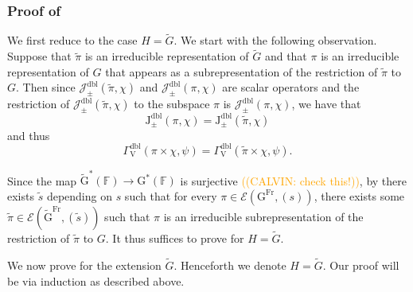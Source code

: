 \documentclass[12pt, reqno]{amsart}
\theoremstyle{definition}
\theoremstyle{definition}
\theoremstyle{definition}
\newcommand{\hermitianSpace}{\mathrm{V}}
\newcommand{\fieldCharacter}{\psi}
\newcommand{\GroupExtension}[1]{\widetilde{#1}}
\newcommand{\finiteField}{\mathbb{F}}
\newcommand{\Frobenius}{\operatorname{Fr}}
\newcommand{\dblJacobiSum}[2]{\mathcal{J}_{\pm}^{\mathrm{dbl}}\left(#1, #2\right)}
\newcommand{\dblJacobiSumScalar}[2]{\mathrm{J}_{\pm}^{\mathrm{dbl}}\left(#1, #2\right)}
\newcommand{\dblGammaFactorSpace}[4]{\Gamma^{\mathrm{dbl}}_{#1}\left(#2 \times #3, #4\right)}
\newcommand{\algebraicGroup}[1]{\boldsymbol{\mathrm{#1}}}
\newcommand{\LusztigSeries}[2]{\mathcal{E}\left(#1, (#2)\right)}
\newcommand{\FrobeniusFixedPoints}[2][\Frobenius]{\algebraicGroup{#2}^{#1}}
\newcommand{\calvin}[1]{\textcolor{orange}{\sffamily ((CALVIN: #1))}}
\begin{document}
\subsubsection{Proof of }
We first reduce  to the case $H = \GroupExtension{G}$. We start with the following observation. Suppose that $\tilde{\pi}$ is an irreducible representation of $\GroupExtension{G}$ and that $\pi$ is an irreducible representation of $G$ that appears as a subrepresentation of the restriction of $\tilde{\pi}$ to $G$. Then since $\dblJacobiSum{\tilde{\pi}}{\chi}$ and $\dblJacobiSum{\pi}{\chi}$ are scalar operators and the restriction of $\dblJacobiSum{\tilde{\pi}}{\chi}$ to the subspace $\pi$ is $\dblJacobiSum{\pi}{\chi}$, we have that $$\dblJacobiSumScalar{\pi}{\chi} = \dblJacobiSumScalar{\tilde{\pi}}{\chi}$$ and thus
$$\dblGammaFactorSpace{\hermitianSpace}{\pi}{\chi}{\fieldCharacter} = \dblGammaFactorSpace{\hermitianSpace}{\tilde{\pi}}{\chi}{\fieldCharacter}.$$

Since the map $\algebraicGroup{\GroupExtension{G}}^*(\finiteField) \to \algebraicGroup{G}^*(\finiteField)$ is surjective \calvin{check this!}, by  there exists $\tilde{s}$ depending on $s$ such that for every $\pi \in \LusztigSeries{\FrobeniusFixedPoints{G}}{s}$, there exists some $\tilde{\pi} \in \LusztigSeries{\FrobeniusFixedPoints{\GroupExtension{G}}}{\tilde{s}}$ such that $\pi$ is an irreducible subrepresentation of the restriction of $\tilde{\pi}$ to $G$. It thus suffices to prove  for $H = \GroupExtension{G}$. 


We now prove  for the extension $\GroupExtension{G}$. Henceforth we denote $H = \GroupExtension{G}$. Our proof will be via induction as described above.
\end{document}
